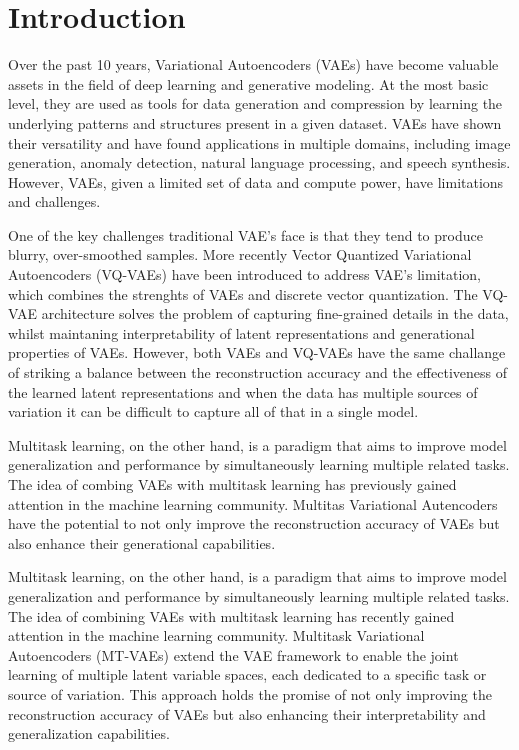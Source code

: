 \chapter{Introduction}

Over the past 10 years, Variational Autoencoders (VAEs) have become valuable assets in the field of deep learning and generative modeling. At the most basic level, they are used as tools for data generation and compression by learning the underlying patterns and structures present in a given dataset. VAEs have shown their versatility and have found applications in multiple domains, including image generation, anomaly detection, natural language processing, and speech synthesis. However, VAEs, given a limited set of data and compute power, have limitations and challenges.\cite{kingma2013autoencoding,Kingma_2019, vqvae, dalle}

One of the key challenges traditional VAE's face is that they tend to produce blurry, over-smoothed samples. More recently Vector Quantized Variational Autoencoders (VQ-VAEs) have been introduced to address VAE's limitation, which combines the strenghts of VAEs and discrete vector quantization.\cite{dalle} The VQ-VAE architecture solves the problem of capturing fine-grained details in the data, whilst maintaning interpretability of latent representations and generational properties of VAEs. However, both VAEs and VQ-VAEs have the same challange of striking a balance between the reconstruction accuracy and the effectiveness of the learned latent representations and when the data has multiple sources of variation it can be difficult to capture all of that in a single model.\cite{Kingma_2019,betavae, vqvae}

Multitask learning, on the other hand, is a paradigm that aims to improve model generalization and performance by simultaneously learning multiple related tasks. The idea of combing VAEs with multitask learning has previously gained attention in the machine learning community. Multitas Variational Autencoders have the potential to not only improve the reconstruction accuracy of VAEs but also enhance their generational capabilities.

Multitask learning, on the other hand, is a paradigm that aims to improve model generalization and performance by simultaneously learning multiple related tasks. The idea of combining VAEs with multitask learning has recently gained attention in the machine learning community. Multitask Variational Autoencoders (MT-VAEs) extend the VAE framework to enable the joint learning of multiple latent variable spaces, each dedicated to a specific task or source of variation. This approach holds the promise of not only improving the reconstruction accuracy of VAEs but also enhancing their interpretability and generalization capabilities.

